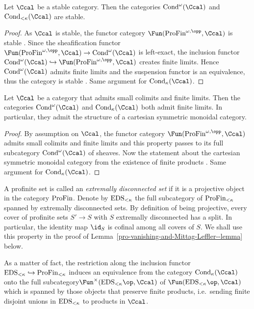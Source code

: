 \documentclass[colorinlistoftodos,article,11pt,reqno]{article}
\newcommand{\Cond}{\textup{Cond}}
\newcommand{\ProFin}{\textup{ProFin}}
\newcommand{\EDS}{\textup{EDS}}
\renewcommand{\to}[1][]{\overset{#1}{\rightarrow}}
\newcommand{\inj}[1][]{\overset{#1}{\hookrightarrow}}		%
\begin{document}
\begin{appendix}
\begin{lemma} \label{condensed-objects-stable--lem}
Let $\Ccal$ be a stable category. Then the categories $\Cond^\omega(\Ccal)$ and $\Cond_{<\kappa}(\Ccal)$ are stable.
\end{lemma}
\begin{proof}
As $\Ccal$ is stable, the functor category $\Fun(\ProFin^{\omega,\opp},\Ccal)$ is stable \cite[1.1.3.1]{HA}.  Since the sheafification functor $\Fun(\ProFin^{\omega,\opp},\Ccal)\to\Cond^\omega(\Ccal)$ is left-exact, the inclusion functor $\Cond^\omega(\Ccal) \inj \Fun(\ProFin^{\omega,\opp},\Ccal)$ creates finite limits. Hence $\Cond^\omega(\Ccal)$ admits finite limits and the suspension functor is an equivalence, thus the category is stable \cite[1.4.2.27]{HA}.
Same argument for $\Cond_\kappa(\Ccal)$.
\end{proof}



\begin{lemma} \label{condensed-objects-symmetric-monoidal}
Let $\Ccal$ be a category that admits small colimits and finite limits. Then the categories $\Cond^\omega(\Ccal)$ and $\Cond_\kappa(\Ccal)$ both admit finite limits. In particular, they admit the structure of a cartesian symmetric monoidal category. 
\end{lemma}
\begin{proof}
By assumption on $\Ccal$, the functor category $\Fun(\ProFin^{\omega,\opp},\Ccal)$ admits small colimits and finite limits \cite[5.1.2.3]{HTT} and this property passes to its full subcategory $\Cond^\omega(\Ccal)$ of sheaves.
Now the statement about the cartesian symmetric monoidal category from the existence of finite products \cite[2.4.1.5.(5)]{HA}.
Same argument for $\Cond_\kappa(\Ccal)$.
\end{proof}


\begin{remark}
\label{extremally-disconnected--rem}
A profinite set is called an \emph{extremally disconnected set} if it is a projective object in the category $\ProFin$. Denote by $\EDS_{<\kappa}$ the full subcategory of $\ProFin_{<\kappa}$ spanned by extremally disconnected sets. By definition of being projective, every cover of profinite sets $S'\to S$ with $S$ extremally disconnected has a split. In particular, the identity map $\id_S$ is cofinal among all covers of $S$. We shall use this property in the proof of Lemma~\ref{pro-vanishing-and-Mittag-Leffler--lemma} below.

As a matter of fact, the restriction along the inclusion functor $\EDS_{<\kappa} \inj \ProFin_{<\kappa}$ induces an equivalence from the category $\Cond_\kappa(\Ccal)$ onto the full subcategory\linebreak $\Fun^\times(\EDS_{<\kappa}\op,\Ccal)$ of $\Fun(\EDS_{<\kappa}\op,\Ccal)$ which is spanned by those objects that preserve finite products, i.e.\ sending finite disjoint unions in $\EDS_{<\kappa}$ to products in $\Ccal$.
\end{remark}


\end{appendix}
\end{document}
